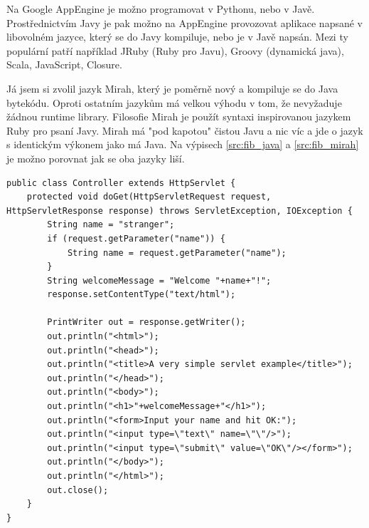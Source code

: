 \documentclass[bc,male,java,dept456]{diploma}						%
\begin{document}

Na Google AppEngine je možno programovat v Pythonu, nebo v Javě. Prostřednictvím Javy je pak možno na AppEngine provozovat aplikace napsané v libovolném jazyce, který se do Javy kompiluje, nebo je v Javě napsán. Mezi ty populární patří například JRuby (Ruby pro Javu), Groovy (dynamická java), Scala, JavaScript, Closure. 

Já jsem si zvolil jazyk Mirah, který je poměrně nový a kompiluje se do Java bytekódu. Oproti ostatním jazykům má velkou výhodu v tom, že nevyžaduje žádnou runtime library. Filosofie Mirah je použít syntaxi inspirovanou jazykem Ruby pro psaní Javy. Mirah má "pod kapotou" čistou Javu a nic víc a jde o jazyk s identickým výkonem jako má Java. Na výpisech \ref{src:fib_java} a \ref{src:fib_mirah} je možno porovnat jak se oba jazyky liší.



\begin{lstlisting}[label=src:fib_java,caption=Hello World servlet v Javě]
public class Controller extends HttpServlet {
	protected void doGet(HttpServletRequest request, HttpServletResponse response) throws ServletException, IOException {
		String name = "stranger";
		if (request.getParameter("name")) {
			String name = request.getParameter("name");
		}
		String welcomeMessage = "Welcome "+name+"!";
		response.setContentType("text/html");
 
		PrintWriter out = response.getWriter();
		out.println("<html>");
		out.println("<head>");
		out.println("<title>A very simple servlet example</title>");
		out.println("</head>");
		out.println("<body>");
		out.println("<h1>"+welcomeMessage+"</h1>");
		out.println("<form>Input your name and hit OK:");
		out.println("<input type=\"text\" name=\"\"/>");
		out.println("<input type=\"submit\" value=\"OK\"/></form>");
		out.println("</body>");
		out.println("</html>");
		out.close();
	}
} 
\end{lstlisting}
\end{document}
